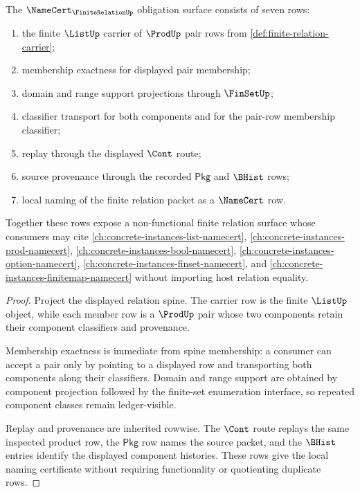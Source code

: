 \begin{theorem}
\label{thm:finite-relation-namecert-obligations}
The $\NameCert_{\FiniteRelationUp}$ obligation surface consists of seven rows:
\begin{enumerate}
  \item the finite $\ListUp$ carrier of $\ProdUp$ pair rows from \autoref{def:finite-relation-carrier};
  \item membership exactness for displayed pair membership;
  \item domain and range support projections through $\FinSetUp$;
  \item classifier transport for both components and for the pair-row membership classifier;
  \item replay through the displayed $\Cont$ route;
  \item source provenance through the recorded $\mathsf{Pkg}$ and $\BHist$ rows;
  \item local naming of the finite relation packet as a $\NameCert$ row.
\end{enumerate}
Together these rows expose a non-functional finite relation surface whose consumers may cite \autoref{ch:concrete-instances-list-namecert}, \autoref{ch:concrete-instances-prod-namecert}, \autoref{ch:concrete-instances-bool-namecert}, \autoref{ch:concrete-instances-option-namecert}, \autoref{ch:concrete-instances-finset-namecert}, and \autoref{ch:concrete-instances-finitemap-namecert} without importing host relation equality.
\end{theorem}
\begin{proof}
Project the displayed relation spine. The carrier row is the finite $\ListUp$ object, while each member row is a $\ProdUp$ pair whose two components retain their component classifiers and provenance.

Membership exactness is immediate from spine membership: a consumer can accept a pair only by pointing to a displayed row and transporting both components along their classifiers. Domain and range support are obtained by component projection followed by the finite-set enumeration interface, so repeated component classes remain ledger-visible.

Replay and provenance are inherited rowwise. The $\Cont$ route replays the same inspected product row, the $\mathsf{Pkg}$ row names the source packet, and the $\BHist$ entries identify the displayed component histories. These rows give the local naming certificate without requiring functionality or quotienting duplicate rows.
\end{proof}

